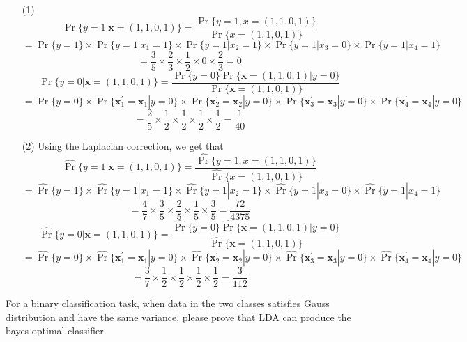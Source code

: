 \begin{solution}
    \begin{enumerate}
        \item[(1)]
            \[\Pr\{y=1|\mathbf{x}=(1,1,0,1)\}=\frac{\Pr\{y=1,x=(1,1,0,1)\}}{\Pr\{x=(1,1,0,1)\}}\]
            \[=\Pr\{y=1\}\times\Pr\{y=1|x_1=1\}\times\Pr\{y=1|x_2=1\}\times\Pr\{y=1|x_3=0\}\times\Pr\{y=1|x_4=1\}\]
            \[=\frac{3}{5}\times\frac{2}{3}\times\frac{1}{2}\times0\times\frac{2}{3}=0\]
            \[\Pr\{y=0|\mathbf{x}=(1,1,0,1)\}=\frac{\Pr\{y=0\}\Pr\{\mathbf{x}=(1,1,0,1)|y=0\}}{\Pr\{\mathbf{x}=(1,1,0,1)\}}\]
            \[=\Pr\{y=0\}\times\Pr\{\mathbf{x}^{\prime}_{1}=\mathbf{x}_1|y=0\}\times\Pr\{\mathbf{x}^{\prime}_2=\mathbf{x}_2|y=0\}\times\Pr\{\mathbf{x}^{\prime}_3=\mathbf{x}_3|y=0\}\times\Pr\{\mathbf{x}^{\prime}_4=\mathbf{x}_4|y=0\}\]
            \[=\frac{2}{5}\times\frac{1}{2}\times\frac{1}{2}\times\frac{1}{2}\times\frac{1}{2}=\frac{1}{40}\]
        \item[(2)] Using the Laplacian correction, we get that
            \[\hat{\Pr}\{y=1|\mathbf{x}=(1,1,0,1)\}=\frac{\hat{\Pr}\{y=1,x=(1,1,0,1)\}}{\hat{\Pr}\{x=(1,1,0,1)\}}\]
            \[=\hat{\Pr}\{y=1\}\times\hat{\Pr}\{y=1|x_1=1\}\times\hat{\Pr}\{y=1|x_2=1\}\times\hat{\Pr}\{y=1|x_3=0\}\times\hat{\Pr}\{y=1|x_4=1\}\]
            \[=\frac{4}{7}\times\frac{3}{5}\times\frac{2}{5}\times\frac{1}{5}\times\frac{3}{5}=\frac{72}{4375}\]
            \[\hat{\Pr}\{y=0|\mathbf{x}=(1,1,0,1)\}=\frac{\hat{\Pr}\{y=0\}\hat{\Pr}\{\mathbf{x}=(1,1,0,1)|y=0\}}{\hat{\Pr}\{\mathbf{x}=(1,1,0,1)\}}\]
            \[=\hat{\Pr}\{y=0\}\times\hat{\Pr}\{\mathbf{x}^{\prime}_{1}=\mathbf{x}_1|y=0\}\times\hat{\Pr}\{\mathbf{x}^{\prime}_2=\mathbf{x}_2|y=0\}\times\hat{\Pr}\{\mathbf{x}^{\prime}_3=\mathbf{x}_3|y=0\}\times\hat{\Pr}\{\mathbf{x}^{\prime}_4=\mathbf{x}_4|y=0\}\]
            \[=\frac{3}{7}\times\frac{1}{2}\times\frac{1}{2}\times\frac{1}{2}\times\frac{1}{2}=\frac{3}{112}\]
    \end{enumerate}
\end{solution}
\begin{problem}
    For a binary classification task, when data in the two classes satisfies Gauss distribution and have the same variance, please prove that LDA can produce the bayes optimal classifier.
\end{problem}



